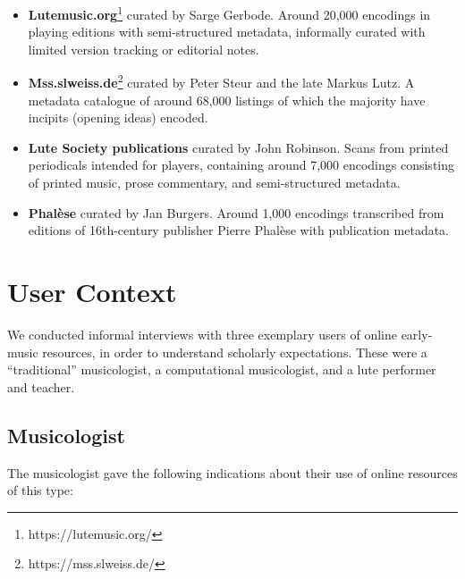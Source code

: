 \documentclass[twocolumn,10pt]{paper}
\begin{document}
\begin{sloppypar}
  \begin{itemize}
    \item {\bf Lutemusic.org}\footnote{https://lutemusic.org/} curated
      by Sarge Gerbode. Around 20,000 encodings in playing editions
      with semi-structured metadata, informally curated with limited
      version tracking or editorial notes.
    \item {\bf Mss.slweiss.de}\footnote{https://mss.slweiss.de/}
      curated by Peter Steur and the late Markus Lutz. A metadata
      catalogue of around 68,000 listings of which the majority have
      incipits (opening ideas) encoded.
    \item {\bf Lute Society publications} curated by John
      Robinson. Scans from printed periodicals intended for players,
      containing around 7,000 encodings consisting of printed music,
      prose commentary, and semi-structured metadata.
    \item {\bf Phal\`ese} curated by Jan Burgers. Around 1,000
      encodings transcribed from editions of 16th-century publisher
      Pierre Phal\`ese with publication metadata.

  \end{itemize}

  
  \section{User Context}

  We conducted informal interviews with three exemplary users of
  online early-music resources, in order to understand scholarly
  expectations. These were a ``traditional'' musicologist, a
  computational musicologist, and a lute performer and teacher.
  
  \subsection{Musicologist}

  The musicologist gave the following indications about their use of
  online resources of this type:


\end{sloppypar}
\end{document}
